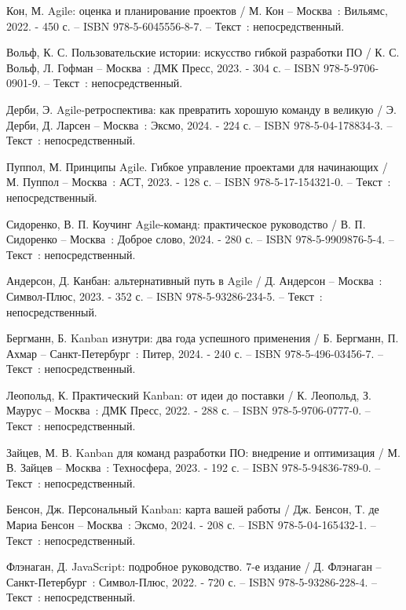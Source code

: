 \begin{thebibliography}{99}
	 Кон, М. Agile: оценка и планирование проектов / М. Кон – Москва~: Вильямс, 2022. - 450 с. – ISBN 978-5-6045556-8-7. – Текст~: непосредственный.
	
	 Вольф, К. С. Пользовательские истории: искусство гибкой разработки ПО / К. С. Вольф, Л. Гофман – Москва~: ДМК Пресс, 2023. - 304 с. – ISBN 978-5-9706-0901-9. – Текст~: непосредственный.
	
	 Дерби, Э. Agile-ретроспектива: как превратить хорошую команду в великую / Э. Дерби, Д. Ларсен – Москва~: Эксмо, 2024. - 224 с. – ISBN 978-5-04-178834-3. – Текст~: непосредственный.
	
	 Пуппол, М. Принципы Agile. Гибкое управление проектами для начинающих / М. Пуппол – Москва~: АСТ, 2023. - 128 с. – ISBN 978-5-17-154321-0. – Текст~: непосредственный.
	
	 Сидоренко, В. П. Коучинг Agile-команд: практическое руководство / В. П. Сидоренко – Москва~: Доброе слово, 2024. - 280 с. – ISBN 978-5-9909876-5-4. – Текст~: непосредственный.
	
	 Андерсон, Д. Канбан: альтернативный путь в Agile / Д. Андерсон – Москва~: Символ-Плюс, 2023. - 352 с. – ISBN 978-5-93286-234-5. – Текст~: непосредственный.
	
	 Бергманн, Б. Kanban изнутри: два года успешного применения / Б. Бергманн, П. Ахмар – Санкт-Петербург~: Питер, 2024. - 240 с. – ISBN 978-5-496-03456-7. – Текст~: непосредственный.
	
	 Леопольд, К. Практический Kanban: от идеи до поставки / К. Леопольд, З. Маурус – Москва~: ДМК Пресс, 2022. - 288 с. – ISBN 978-5-9706-0777-0. – Текст~: непосредственный.
	
	 Зайцев, М. В. Kanban для команд разработки ПО: внедрение и оптимизация / М. В. Зайцев – Москва~: Техносфера, 2023. - 192 с. – ISBN 978-5-94836-789-0. – Текст~: непосредственный.
	
	 Бенсон, Дж. Персональный Kanban: карта вашей работы / Дж. Бенсон, Т. де Мариа Бенсон – Москва~: Эксмо, 2024. - 208 с. – ISBN 978-5-04-165432-1. – Текст~: непосредственный.
	
	 Флэнаган, Д. JavaScript: подробное руководство. 7-е издание / Д. Флэнаган – Санкт-Петербург~: Символ-Плюс, 2022. - 720 с. – ISBN 978-5-93286-228-4. – Текст~: непосредственный.
	

\end{thebibliography}
